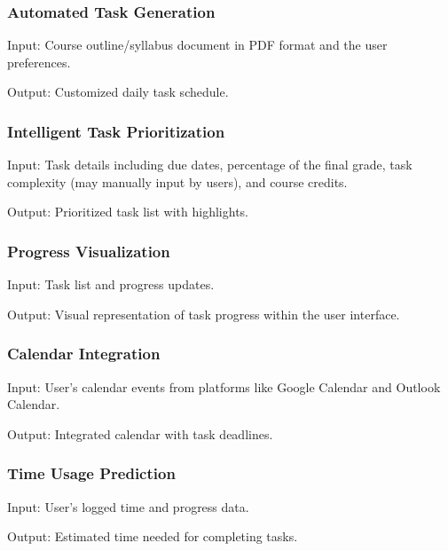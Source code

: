 \documentclass{article}
\begin{document}
\subsubsection{Automated Task Generation}
\vspace{1ex}

\noindent Input: Course outline/syllabus document in PDF format and the user preferences.

\noindent Output: Customized daily task schedule.
   
\subsubsection{Intelligent Task Prioritization}
\vspace{1ex}

\noindent Input: Task details including due dates, percentage of the final grade, task complexity (may manually input by users), and course credits.

\noindent Output: Prioritized task list with highlights.
 
\subsubsection{Progress Visualization}
\vspace{1ex}

\noindent Input: Task list and progress updates.

\noindent Output: Visual representation of task progress within the user interface.
 
\subsubsection{Calendar Integration}
\vspace{1ex}

\noindent Input: User's calendar events from platforms like Google Calendar and Outlook Calendar.

\noindent Output: Integrated calendar with task deadlines.
 
\subsubsection{Time Usage Prediction}
\vspace{1ex}

\noindent Input: User's logged time and progress data.

\noindent Output: Estimated time needed for completing tasks.
\end{document}

